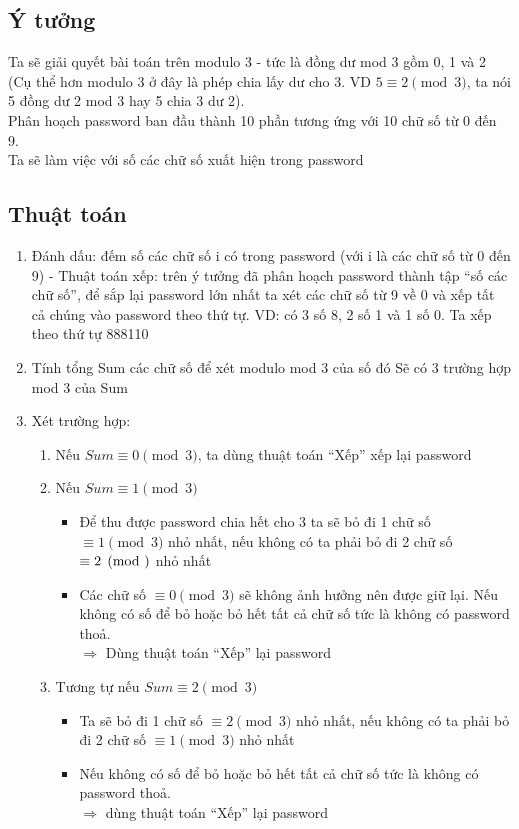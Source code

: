 \subsection{Ý tưởng}
Ta sẽ giải quyết bài toán trên modulo 3 - tức là đồng dư mod 3 gồm 0, 1 và 2
(Cụ thể hơn modulo 3 ở đây là phép chia lấy dư cho 3. VD $5 \equiv 2 \pmod 3$, ta nói 5 đồng dư 2 mod 3
hay 5 chia 3 dư 2).\\
Phân hoạch password ban đầu thành 10 phần tương ứng với 10 chữ số từ 0 đến 9.\\
Ta sẽ làm việc với số các chữ số xuất hiện trong password
    

\subsection{Thuật toán}
\begin{enumerate}
    \item Đánh dấu: đếm số các chữ số i có trong password (với i là các chữ số từ 0 đến 9)
        - Thuật toán xếp: trên ý tưởng đã phân hoạch password thành tập ``số các chữ số'', để sắp lại password
        lớn nhất ta xét các chữ số từ 9 về 0 và xếp tất cả chúng vào password theo thứ tự.
        VD: có 3 số 8, 2 số 1 và 1 số 0. Ta xếp theo thứ tự 888110
    \item Tính tổng Sum các chữ số để xét modulo mod 3 của số đó
        Sẽ có 3 trường hợp mod 3 của Sum
    \item Xét trường hợp:
    \begin{enumerate}
        \item Nếu $Sum \equiv 0 \pmod 3$, ta dùng thuật toán ``Xếp'' xếp lại password
        \item Nếu $Sum \equiv 1 \pmod 3$
        \begin{itemize}
            \item Để thu được password chia hết cho 3 ta sẽ bỏ đi 1 chữ số $\equiv 1 \pmod 3$ nhỏ nhất, nếu không
            có ta phải bỏ đi 2 chữ số $\equiv 2 \pmod $ nhỏ nhất
            \item Các chữ số $\equiv 0 \pmod 3$ sẽ không ảnh hưởng nên được giữ lại. Nếu không có số để bỏ hoặc bỏ hết
            tất cả chữ số tức là không có password thoả.\\
            \qquad $\Rightarrow$ Dùng thuật toán ``Xếp'' lại password
        \end{itemize}
        \item Tương tự nếu $Sum \equiv 2 \pmod 3$
        \begin{itemize}
            \item Ta sẽ bỏ đi 1 chữ số $\equiv 2 \pmod 3$ nhỏ nhất, nếu không có ta phải bỏ đi 2 chữ số $\equiv 1 \pmod 3$
            nhỏ nhất
            \item Nếu không có số để bỏ hoặc bỏ hết tất cả chữ số tức là không có password thoả.
            \\ \qquad $\Rightarrow$ dùng thuật toán ``Xếp'' lại password
        \end{itemize}
    \end{enumerate}
\end{enumerate}

